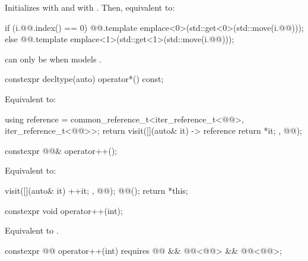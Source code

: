 \begin{itemdescr}
\pnum
\effects
Initializes  with
 and
 with .
Then, equivalent to:
\begin{codeblock}
if (i.@@.index() == 0)
  @@.template emplace<0>(std::get<0>(std::move(i.@@)));
else
  @@.template emplace<1>(std::get<1>(std::move(i.@@)));
\end{codeblock}

\pnum
\begin{note}
 can only be 
when  models .
\end{note}
\end{itemdescr}

\begin{itemdecl}
constexpr decltype(auto) operator*() const;
\end{itemdecl}

\begin{itemdescr}
\pnum
\effects
Equivalent to:
\begin{codeblock}
using reference =
  common_reference_t<iter_reference_t<@@>, iter_reference_t<@@>>;
return visit([](auto& it) -> reference { return *it; }, @@);
\end{codeblock}
\end{itemdescr}

\begin{itemdecl}
constexpr @@& operator++();
\end{itemdecl}

\begin{itemdescr}
\pnum
\effects
Equivalent to:
\begin{codeblock}
visit([](auto& it){ ++it; }, @@);
@@();
return *this;
\end{codeblock}
\end{itemdescr}

\begin{itemdecl}
constexpr void operator++(int);
\end{itemdecl}

\begin{itemdescr}
\pnum
\effects
Equivalent to .
\end{itemdescr}

\begin{itemdecl}
constexpr @@ operator++(int)
  requires @@ && @@<@@> && @@<@@>;
\end{itemdecl}

